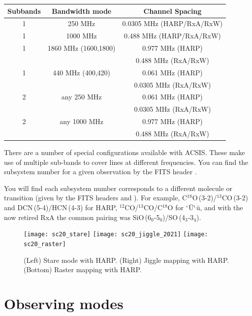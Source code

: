 \documentclass[11pt,oneside,chapters]{starlink}
\begin{document}
\newpage
\begin{table}[h!]
\begin{center}
\begin{tabular}{c|c|c}
\hline
\textbf{Subbands} & \textbf{Bandwidth mode}  & \textbf{Channel Spacing}\\
\hline
1 & 250 MHz & 0.0305 MHz (HARP/RxA/RxW)\\
1 &1000 MHz & 0.488 MHz (HARP/RxA/RxW)\\
1 &1860 MHz (1600,1800) & 0.977 MHz (HARP) \\
  &         & 0.488 MHz (RxA/RxW)\\
1 & 440 MHz (400,420) & 0.061 MHz (HARP) \\
  &         & 0.0305 MHz (RxA/RxW)\\
\hline
2 & any 250 MHz      & 0.061 MHz (HARP)\\
  &         & 0.0305 MHz (RxA/RxW)\\
2 &any 1000 MHz & 0.977 MHz (HARP) \\
  &         & 0.488 MHz (RxA/RxW)\\
\hline
\end{tabular}
\label{fig:backend}
\end{center}
\end{table}
There are a number of special configurations available with ACSIS.
These make use of multiple sub-bands to cover lines at different
frequencies.  You can find the subsystem number for a given
observation by the FITS header .

You will find each subsystem number corresponds to a different
molecule or transition (given by the FITS headers  and
). For example,
C$^{18}$O\,(3-2)/$^{13}$CO\,(3-2) and DCN\,(5-4)/HCN\,(4-3) for HARP,
$^{12}$CO/$^{13}$CO/C$^{18}$O for $`$\=U$`$\=u, and with the now retired
RxA the common pairing was SiO\,(6$_0$-5$_0$)/SO\,(4$_3$-3$_4$).

\begin{figure}[t!]
\begin{center}
\texttt{[image: sc20\_stare]}
\texttt{[image: sc20\_jiggle\_2021]}
\texttt{[image: sc20\_raster]}
\caption[Stare, jiggle and raster observing modes]{\label{fig:harpmodes}
  (Left) Stare mode with HARP. (Right) Jiggle mapping with HARP.
  (Bottom) Raster mapping with HARP.}
\end{center}
\end{figure}


\section{Observing modes}
\label{sec:obsmodes}
\end{document}

